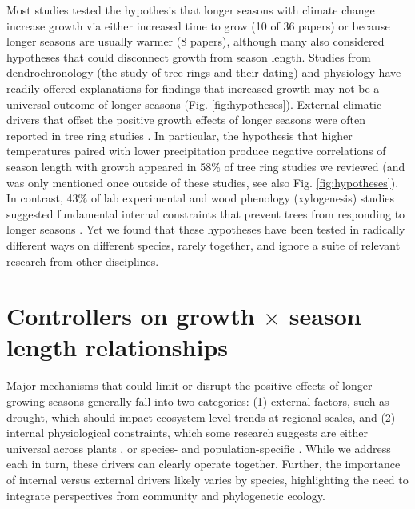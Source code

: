 \documentclass[11pt]{article}
\newcommand{\R}[1]{\label{#1}\linelabel{#1}}
\begin{document}
Most studies tested the hypothesis that longer seasons with climate change increase growth via either increased time to grow (10 of 36 papers) or because longer seasons are usually warmer (8 papers), although many also considered hypotheses that could disconnect growth from season length. Studies from dendrochronology (the study of tree rings and their dating) and physiology have readily offered explanations for findings that increased growth may not be a universal outcome of longer seasons (Fig. \ref{fig:hypotheses}). External climatic drivers that offset the positive growth effects of longer seasons were often reported in tree ring studies \citep{kolavr2016response,de2022temperature,camarero2022decoupled}. In particular, the hypothesis that higher temperatures paired with lower precipitation produce negative correlations of season length with growth appeared in 58\% of tree ring studies we reviewed (and was only mentioned once outside of these studies, see also Fig. \ref{fig:hypotheses}). In contrast, 43\% of lab experimental and wood phenology (xylogenesis) studies suggested fundamental internal constraints that prevent trees from responding to longer seasons \citep[Fig. \ref{fig:heatmapssupp},][]{cuny2012life,michelot2012comparing,zohner2023effect}. Yet we found that these hypotheses have been tested in radically different ways on different species, rarely together, and ignore a suite of relevant research from other disciplines. %
 
\section*{Controllers on growth $\times$ season length relationships}

Major mechanisms that could limit or disrupt the positive effects of longer growing seasons generally fall into two categories: (1) external factors, such as drought, which should impact ecosystem-level trends at regional scales, and (2) internal physiological constraints, which some research suggests are either universal across plants \citep[e.g.][]{zohner2023effect}, or species- and population-specific \citep[e.g.][]{soolanayakanahally2013timing}. \R{R2complaint1nonmutexcl}While we address each in turn, these drivers can clearly operate together. Further, the importance of internal versus external drivers likely varies by species, highlighting the need to integrate perspectives from community and phylogenetic ecology. 
\end{document}
